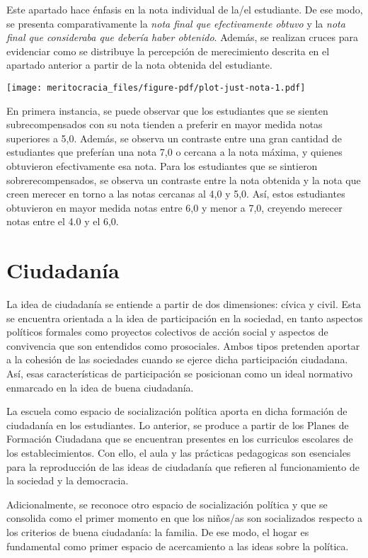 \documentclass[
  letterpaper,
  DIV=11,
  numbers=noendperiod]{scrreprt}
\begin{document}
Este apartado hace énfasis en la nota individual de la/el estudiante. De
ese modo, se presenta comparativamente la \emph{nota final que
efectivamente obtuvo} y la \emph{nota final que consideraba que debería
haber obtenido}. Además, se realizan cruces para evidenciar como se
distribuye la percepción de merecimiento descrita en el apartado
anterior a partir de la nota obtenida del estudiante.

\texttt{[image: meritocracia\_files/figure-pdf/plot-just-nota-1.pdf]}

En primera instancia, se puede observar que los estudiantes que se
sienten subrecompensados con su nota tienden a preferir en mayor medida
notas superiores a 5,0. Además, se observa un contraste entre una gran
cantidad de estudiantes que preferían una nota 7,0 o cercana a la nota
máxima, y quienes obtuvieron efectivamente esa nota. Para los
estudiantes que se sintieron sobrerecompensados, se observa un contraste
entre la nota obtenida y la nota que creen merecer en torno a las notas
cercanas al 4,0 y 5,0. Así, estos estudiantes obtuvieron en mayor medida
notas entre 6,0 y menor a 7,0, creyendo merecer notas entre el 4.0 y el
6,0.


\chapter{Ciudadanía}\label{ciudadanuxeda}

La idea de ciudadanía se entiende a partir de dos dimensiones: cívica y
civil. Esta se encuentra orientada a la idea de participación en la
sociedad, en tanto aspectos políticos formales como proyectos colectivos
de acción social y aspectos de convivencia que son entendidos como
prosociales. Ambos tipos pretenden aportar a la cohesión de las
sociedades cuando se ejerce dicha participación ciudadana. Así, esas
características de participación se posicionan como un ideal normativo
enmarcado en la idea de buena ciudadanía.

La escuela como espacio de socialización política aporta en dicha
formación de ciudadanía en los estudiantes. Lo anterior, se produce a
partir de los Planes de Formación Ciudadana que se encuentran presentes
en los curriculos escolares de los establecimientos. Con ello, el aula y
las prácticas pedagogicas son esenciales para la reproducción de las
ideas de ciudadanía que refieren al funcionamiento de la sociedad y la
democracia.

Adicionalmente, se reconoce otro espacio de socialización política y que
se consolida como el primer momento en que los niños/as son socializados
respecto a los criterios de buena ciudadanía: la familia. De ese modo,
el hogar es fundamental como primer espacio de acercamiento a las ideas
sobre la política.
\end{document}
